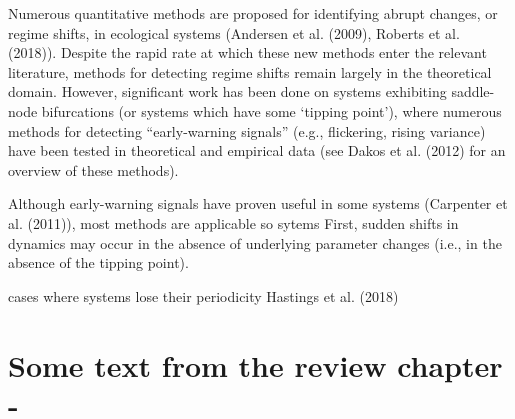 \documentclass[12pt,twoside,openany]{reedthesis}
\begin{document}
Numerous quantitative methods are proposed for identifying abrupt
changes, or regime shifts, in ecological systems (Andersen et al.
(2009), Roberts et al. (2018)). Despite the rapid rate at which these
new methods enter the relevant literature, methods for detecting regime
shifts remain largely in the theoretical domain. However, significant
work has been done on systems exhibiting saddle-node bifurcations (or
systems which have some `tipping point'), where numerous methods for
detecting ``early-warning signals'' (e.g., flickering, rising variance)
have been tested in theoretical and empirical data (see Dakos et al.
(2012) for an overview of these methods).

Although early-warning signals have proven useful in some systems
(Carpenter et al. (2011)), most methods are applicable so sytems First,
sudden shifts in dynamics may occur in the absence of underlying
parameter changes (i.e., in the absence of the tipping point).

cases where systems lose their periodicity Hastings et al. (2018)

\section{Some text from the review chapter
-}\label{some-text-from-the-review-chapter--}
\end{document}
